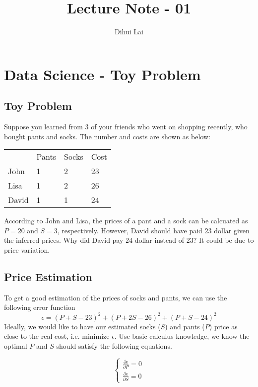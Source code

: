 \documentclass[12pt, oneside]{article}
\title{Lecture Note - 01}
\author{Dihui Lai}
\begin{document}
\maketitle
\tableofcontents

\vspace{.25in}

\section{Data Science - Toy Problem}

\subsection{Toy Problem}
Suppose you learned from 3 of your friends who went on shopping recently, who bought pants and socks. The number and costs are shown as below:

\vspace{.1in}
\begin{tabular}{llll}
 &Pants  &Socks &Cost  \\
 John &1 	 &2      &23   \\
 Lisa &1      &2      &26   \\
 David &1      &1      &24 
\end{tabular}

\vspace{.1in}
According to John and Lisa, the prices of a pant and a sock can be calcuated as $P=20$ and $S=3$, respectively. However, David should have paid $23$ dollar given the inferred prices. Why did David pay $24$ dollar instead of $23$? It could be due to price variation.

\subsection{Price Estimation}
To get a good estimation of the prices of socks and pants, we can use the following error function
$$\epsilon=(P+S-23)^2+(P+2S-26)^2+(P+S-24)^2$$
Ideally, we would like to have our estimated socks ($S$) and pants ($P$) price as close to the real cost, i.e. minimize $\epsilon$.
Use basic calculus knowledge, we know the optimal $P$ and $S$ should satisfy the following equations.

\begin{equation}
\begin{cases}
\frac{\partial{\epsilon}}{\partial{P}}=0\\
\frac{\partial{\epsilon}}{\partial{S}}=0
\end{cases}
\end{equation}
\end{document}
